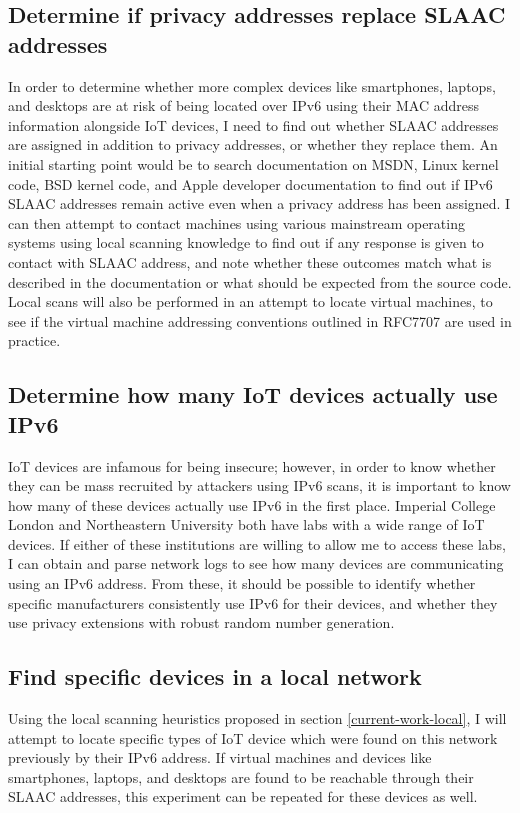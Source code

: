 \documentclass[10pt,sigconf]{acmart}
\begin{document}
\subsection{Determine if privacy addresses replace SLAAC addresses}
In order to determine whether more complex devices like smartphones, laptops, and desktops are at risk of being located over IPv6 using their MAC address information alongside IoT devices, I need to find out whether SLAAC addresses are assigned in addition to privacy addresses, or whether they replace them.
An initial starting point would be to search documentation on MSDN, Linux kernel code, BSD kernel code, and Apple developer documentation to find out if IPv6 SLAAC addresses remain active even when a privacy address has been assigned.
I can then attempt to contact machines using various mainstream operating systems using local scanning knowledge to find out if any response is given to contact with SLAAC address, and note whether these outcomes match what is described in the documentation or what should be expected from the source code.
Local scans will also be performed in an attempt to locate virtual machines, to see if the virtual machine addressing conventions outlined in RFC7707 \cite{rfc-ipv6-rec} are used in practice.

\subsection{Determine how many IoT devices actually use IPv6}
IoT devices are infamous for being insecure;
however, in order to know whether they can be mass recruited by attackers using IPv6 scans, it is important to know how many of these devices actually use IPv6 in the first place.
Imperial College London and Northeastern University both have labs with a wide range of IoT devices.
If either of these institutions are willing to allow me to access these labs, I can obtain and parse network logs to see how many devices are communicating using an IPv6 address.
From these, it should be possible to identify whether specific manufacturers consistently use IPv6 for their devices, and whether they use privacy extensions with robust random number generation.

\subsection{Find specific devices in a local network}
Using the local scanning heuristics proposed in section \ref{current-work-local}, I will attempt to locate specific types of IoT device which were found on this network previously by their IPv6 address.
If virtual machines and devices like smartphones, laptops, and desktops are found to be reachable through their SLAAC addresses, this experiment can be repeated for these devices as well.
\end{document}
